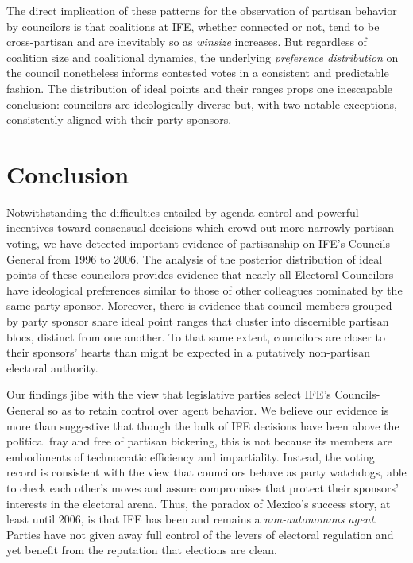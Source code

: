 \documentclass[12 pt, letter]{article}
\begin{document}
The direct implication of these patterns for the observation of partisan behavior by councilors is that coalitions at IFE, whether connected or not, tend to be cross-partisan and are inevitably so as \emph{winsize} increases.  But regardless of coalition size and coalitional dynamics, the underlying \emph{preference distribution} on the council nonetheless informs contested votes in a consistent and predictable fashion. The distribution of ideal points and their ranges props one inescapable conclusion: councilors are ideologically diverse but, with two notable exceptions, consistently aligned with their party sponsors.

\section{Conclusion}\label{S:discussion}
Notwithstanding the difficulties entailed by agenda control and powerful incentives toward consensual decisions which crowd out more narrowly partisan voting, we have detected important evidence of partisanship on IFE's Councils-General from 1996 to 2006.  The analysis of the posterior distribution of ideal points of these councilors provides evidence that nearly all Electoral Councilors have ideological preferences similar to those of other colleagues nominated by the same party sponsor. Moreover, there is evidence that council members grouped by party sponsor share ideal point ranges that cluster into discernible partisan blocs, distinct from one another. To that same extent, councilors are closer to their sponsors' hearts than might be expected in a putatively non-partisan electoral authority.

Our findings jibe with the view that legislative parties select IFE's Councils-General so as to retain control over agent behavior.  We believe our evidence is more than suggestive that though the bulk of IFE decisions have been above the political fray and free of partisan bickering, this is not because its members are embodiments of technocratic efficiency and impartiality.  Instead, the voting record is consistent with the view that councilors behave as party watchdogs, able to check each other's moves and assure compromises that protect their sponsors' interests in the electoral arena. Thus, the paradox of Mexico's success story, at least until 2006, is that IFE has been and remains a \emph{non-autonomous agent}. Parties have not given away full control of the levers of electoral regulation and yet benefit from the reputation that elections are clean.
\end{document}
